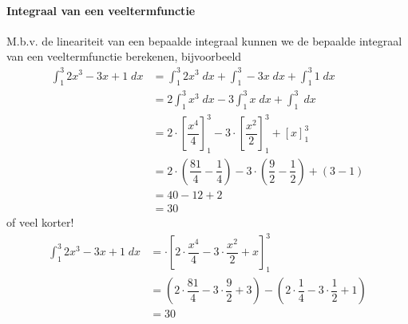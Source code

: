 \documentclass[a4paper,12pt, twoside]{article}
\begin{document}
\paragraph*{Integraal van een veeltermfunctie}
M.b.v. de lineariteit van een bepaalde integraal kunnen we de bepaalde integraal van een veeltermfunctie berekenen, bijvoorbeeld
\begin{align*}
  \int_1^3 2x^3-3x+1 \;dx &= \int_1^3 2x^3 \;dx + \int_1^3 -3x \;dx + \int_1^3 1 \;dx\\
                       &= 2\int_1^3 x^3 \;dx - 3\int_1^3 x \;dx + \int_1^3 \;dx\\
                       &= 2\cdot\left[\dfrac{x^4}{4}\right]_1^3
                         - 3\cdot\left[\dfrac{x^2}{2}\right]_1^3
                         + \left[x\right]_1^3\\
                       &= 2\cdot \left(\dfrac{81}{4}-\dfrac{1}{4}\right)
                         - 3\cdot \left(\dfrac{9}{2}-\dfrac{1}{2}\right)
                         + \left(3-1\right)\\
                       &= 40 - 12 + 2\\
                       &= 30
\end{align*}
of veel korter!
\begin{align*}
  \int_1^3 2x^3-3x+1 \;dx &= \cdot\left[2\cdot\dfrac{x^4}{4} - 3\cdot\dfrac{x^2}{2} + x\right]_1^3\\
                       &= (2\cdot \dfrac{81}{4} - 3\cdot \dfrac{9}{2} + 3)
                         - (2\cdot \dfrac{1}{4} - 3\cdot \dfrac{1}{2} + 1)\\
                       &= 30
\end{align*}
\end{document}
